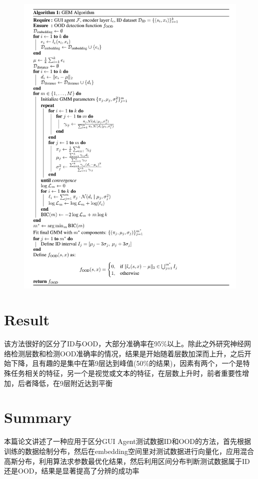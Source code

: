 \documentclass[a4paper,12pt]{article}
\begin{document}
\begin{figure}[H]
    \centering
    \includegraphics[width=\textwidth]{algorithm.png}
\end{figure}

\section{Result}
该方法很好的区分了ID与OOD，大部分准确率在95\%以上。除此之外研究神经网络检测层数和检测OOD准确率的情况，结果是开始随着层数加深而上升，之后开始下降，且有趣的是集中在第9层达到峰值(50\%的结果)，因素有两个，一个是特殊任务相关的特征，另一个是视觉或文本的特征，在层数上升时，前者重要性增加，后者降低，在9层附近达到平衡

\section{Summary}
本篇论文讲述了一种应用于区分GUI Agent测试数据ID和OOD的方法，首先根据训练的数据绘制分布，然后在embedding空间里对测试数据进行向量化，应用混合高斯分布，利用算法求参数最优化结果，然后利用区间分布判断测试数据属于ID还是OOD，结果是显著提高了分辨的成功率
\end{document}
